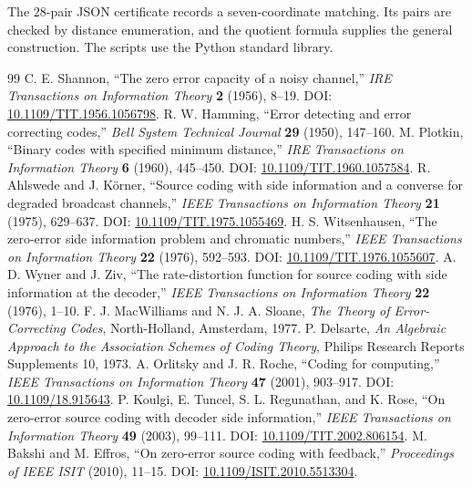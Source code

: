 \documentclass[11pt,a4paper]{article}
\begin{document}
The 28-pair JSON certificate records a seven-coordinate matching. Its pairs are checked by distance enumeration, and the quotient formula supplies the general construction. The scripts use the Python standard library.



\begin{thebibliography}{99}\small
{} C. E. Shannon, ``The zero error capacity of a noisy channel,'' \emph{IRE Transactions on Information Theory} \textbf{2} (1956), 8--19. DOI: \href{https://doi.org/10.1109/TIT.1956.1056798}{10.1109/TIT.1956.1056798}.
 R. W. Hamming, ``Error detecting and error correcting codes,'' \emph{Bell System Technical Journal} \textbf{29} (1950), 147--160.
 M. Plotkin, ``Binary codes with specified minimum distance,'' \emph{IRE Transactions on Information Theory} \textbf{6} (1960), 445--450. DOI: \href{https://doi.org/10.1109/TIT.1960.1057584}{10.1109/TIT.1960.1057584}.
 R. Ahlswede and J. K\"orner, ``Source coding with side information and a converse for degraded broadcast channels,'' \emph{IEEE Transactions on Information Theory} \textbf{21} (1975), 629--637. DOI: \href{https://doi.org/10.1109/TIT.1975.1055469}{10.1109/TIT.1975.1055469}.
 H. S. Witsenhausen, ``The zero-error side information problem and chromatic numbers,'' \emph{IEEE Transactions on Information Theory} \textbf{22} (1976), 592--593. DOI: \href{https://doi.org/10.1109/TIT.1976.1055607}{10.1109/TIT.1976.1055607}.
 A. D. Wyner and J. Ziv, ``The rate-distortion function for source coding with side information at the decoder,'' \emph{IEEE Transactions on Information Theory} \textbf{22} (1976), 1--10.
 F. J. MacWilliams and N. J. A. Sloane, \emph{The Theory of Error-Correcting Codes}, North-Holland, Amsterdam, 1977.
 P. Delsarte, \emph{An Algebraic Approach to the Association Schemes of Coding Theory}, Philips Research Reports Supplements 10, 1973.
 A. Orlitsky and J. R. Roche, ``Coding for computing,'' \emph{IEEE Transactions on Information Theory} \textbf{47} (2001), 903--917. DOI: \href{https://doi.org/10.1109/18.915643}{10.1109/18.915643}.
 P. Koulgi, E. Tuncel, S. L. Regunathan, and K. Rose, ``On zero-error source coding with decoder side information,'' \emph{IEEE Transactions on Information Theory} \textbf{49} (2003), 99--111. DOI: \href{https://doi.org/10.1109/TIT.2002.806154}{10.1109/TIT.2002.806154}.
 M. Bakshi and M. Effros, ``On zero-error source coding with feedback,'' \emph{Proceedings of IEEE ISIT} (2010), 11--15. DOI: \href{https://doi.org/10.1109/ISIT.2010.5513304}{10.1109/ISIT.2010.5513304}.

\end{thebibliography}
\end{document}
